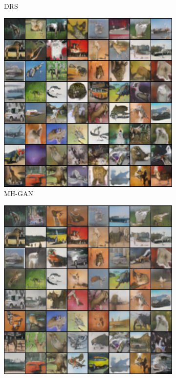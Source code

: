 \begin{figure}[htbp]
\begin{subfigure}[b]{0.49\textwidth}
       \caption{DRS}
    \end{subfigure}
    \begin{subfigure}[b]{0.49\textwidth}
       \centering
       \includegraphics[width=\exfactor\textwidth]{figures/cifar/192_base_raw_MH.png}
       \caption{MH-GAN}
    \end{subfigure}
    \begin{subfigure}[b]{0.49\textwidth}
       \centering
       \includegraphics[width=\exfactor\textwidth]{figures/cifar/192_base_iso_MH.png}

\end{subfigure}
\end{figure}
